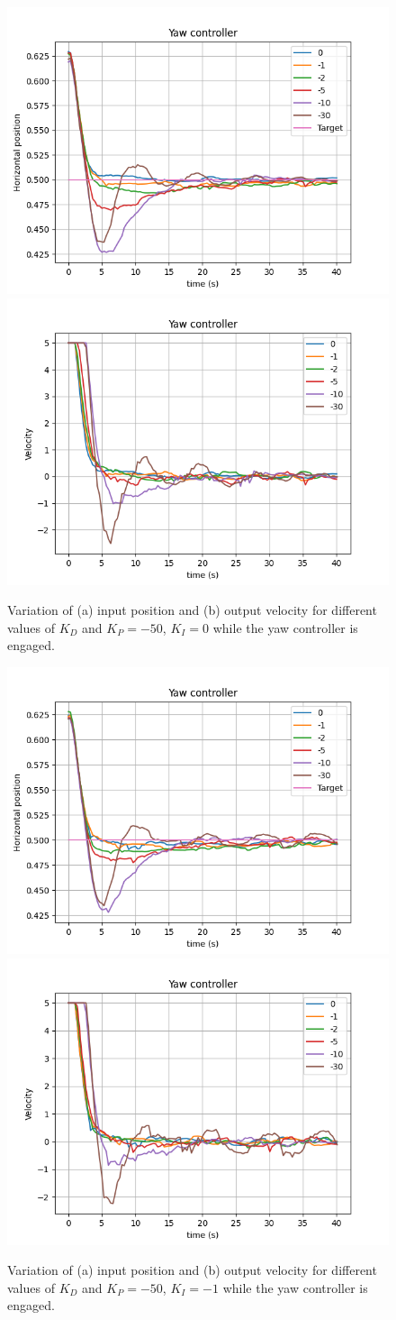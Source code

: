 \begin{figure}
  \centering
  \includegraphics[width=.45\linewidth]{img/pid/yaw/yaw_pos_p50_i0_der.png}
  \includegraphics[width=.45\linewidth]{img/pid/yaw/yaw_vel_p50_i0_der.png}
  \caption{Variation of (a) input position and (b) output velocity for different values of $K_{D}$ and $K_P=-50$, $K_I=0$ while the yaw controller is engaged.}\label{fig:tune-yaw-der-i0}
\end{figure}

\begin{figure}
  \centering
  \includegraphics[width=.45\linewidth]{img/pid/yaw/yaw_pos_p50_i1_der.png}
  \includegraphics[width=.45\linewidth]{img/pid/yaw/yaw_vel_p50_i1_der.png}
  \caption{Variation of (a) input position and (b) output velocity for different values of $K_{D}$ and $K_P=-50$, $K_I=-1$ while the yaw controller is engaged.}\label{fig:tune-yaw-der-i1}
\end{figure}

